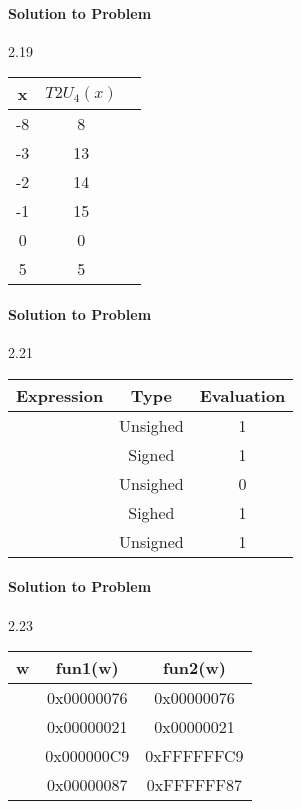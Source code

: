 \documentclass{report}
\begin{document}
\paragraph{Solution to Problem} 2.19 \\
\begin{center}
\begin{tabular}{ |c|c|c| } 
\hline
x & $T2U_4(x)$ \\
\hline
-8 & 8 \\
-3 & 13 \\
-2 & 14 \\
-1 & 15 \\
0 & 0 \\
5 & 5 \\
\hline
\end{tabular}
\end{center}

\paragraph{Solution to Problem} 2.21 \\

\begin{center}
\begin{tabular}{ |c|c|c| } 
\hline
Expression & Type & Evaluation \\
\hline
& Unsighed & 1 \\
\hline
& Signed & 1 \\
\hline
& Unsighed & 0 \\
\hline
& Sighed & 1 \\
\hline
& Unsigned & 1 \\
\hline
\end{tabular}
\end{center}

\paragraph{Solution to Problem} 2.23 \\
\begin{center}
\begin{tabular}{ |c|c|c| } 
\hline
w & fun1(w) & fun2(w) \\
\hline
& 0x00000076 & 0x00000076 \\
\hline
& 0x00000021 & 0x00000021 \\
\hline
& 0x000000C9 & 0xFFFFFFC9 \\
\hline
& 0x00000087 & 0xFFFFFF87 \\
\hline
\end{tabular}
\end{center}
\end{document}
